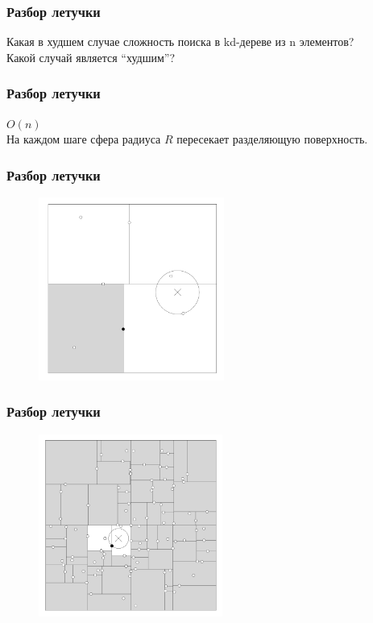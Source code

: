 \documentclass[12pt]{beamer}
\subtitle{Лекция 4. Методы кластеризации}
\begin{document}
\frame{\titlepage}


\begin{frame}\frametitle{Разбор летучки}
Какая в худшем случае сложность поиска в kd-дереве из n элементов? \\
Какой случай является “худшим”?
\end{frame}

\begin{frame}\frametitle{Разбор летучки}
$O(n)$\\
На каждом шаге сфера радиуса $R$ пересекает разделяющую поверхность. 
\end{frame}


\begin{frame}\frametitle{Разбор летучки}
\begin{figure}[htbp]
\centering
\includegraphics[height=170pt]{images/kd-nn}  
\end{figure}
\end{frame}

\begin{frame}\frametitle{Разбор летучки}
\begin{figure}[htbp]
\centering
\includegraphics[height=170pt]{images/kd-nn1}  
\end{figure}
\end{frame}
\end{document}
